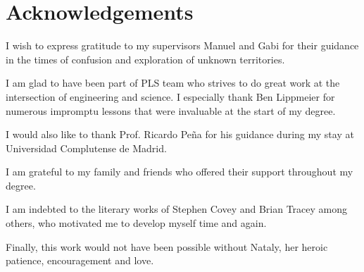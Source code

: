 \documentclass[preamble.tex]{subfiles}
\begin{document}
\chapter*{Acknowledgements}

I wish to express gratitude to my supervisors Manuel and Gabi for their guidance in the times of confusion and exploration of unknown territories.

I am glad to have been part of PLS team who strives to do great work at the intersection of engineering and science. I especially thank Ben Lippmeier for numerous impromptu lessons that were invaluable at the start of my degree.

I would also like to thank Prof. Ricardo Peña for his guidance during my stay at Universidad Complutense de Madrid.

I am grateful to my family and friends who offered their support throughout my degree.

I am indebted to the literary works of Stephen Covey and Brian Tracey among others, who motivated me to develop myself time and again.

Finally, this work would not have been possible without Nataly, her heroic patience, encouragement and love.
\end{document}
